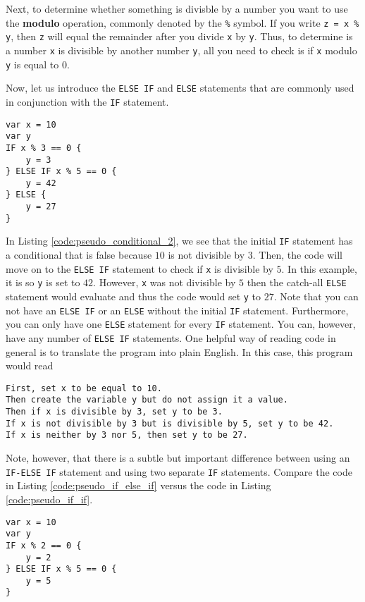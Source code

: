 \documentclass{article}
\begin{document}
Next, to determine whether something is divisble by a number you want to use the \textbf{modulo} operation, commonly denoted by the \lstinline{%} symbol.
If you write \lstinline{z = x % y}, then \lstinline{z} will equal the remainder after you divide \lstinline{x} by \lstinline{y}.
Thus, to determine is a number \lstinline{x} is divisible by another number \lstinline{y}, all you need to check is if \lstinline{x} modulo \lstinline{y} is equal to $0$.

Now, let us introduce the \lstinline{ELSE IF} and \lstinline{ELSE} statements that are commonly used in conjunction with the \lstinline{IF} statement.
\begin{lstlisting}[caption={A stereotypical IF-ELSE IF-ELSE statement.}, label={code:pseudo_conditional_2}]
var x = 10
var y
IF x % 3 == 0 {
    y = 3
} ELSE IF x % 5 == 0 {
    y = 42
} ELSE {
    y = 27
}
\end{lstlisting}
In Listing \ref{code:pseudo_conditional_2}, we see that the initial \lstinline{IF} statement has a conditional that is false because $10$ is not divisible by $3$.
Then, the code will move on to the \lstinline{ELSE IF} statement to check if \lstinline{x} is divisible by $5$.
In this example, it is so \lstinline{y} is set to $42$.
However, \lstinline{x} was not divisible by $5$ then the catch-all \lstinline{ELSE} statement would evaluate and thus the code would set \lstinline{y} to $27$.
Note that you can not have an \lstinline{ELSE IF} or an \lstinline{ELSE} without the initial \lstinline{IF} statement.
Furthermore, you can only have one \lstinline{ELSE} statement for every \lstinline{IF} statement.
You can, however, have any number of \lstinline{ELSE IF} statements.
One helpful way of reading code in general is to translate the program into plain English.
In this case, this program would read
\begin{lstlisting}
First, set x to be equal to 10.
Then create the variable y but do not assign it a value.
Then if x is divisible by 3, set y to be 3.
If x is not divisible by 3 but is divisible by 5, set y to be 42.
If x is neither by 3 nor 5, then set y to be 27.
\end{lstlisting}

Note, however, that there is a subtle but important difference between using an \lstinline{IF-ELSE IF} statement and using two separate \lstinline{IF} statements.
Compare the code in Listing \ref{code:pseudo_if_else_if} versus the code in Listing \ref{code:pseudo_if_if}.

\begin{lstlisting}[caption={IF ELSE-IF.}, label={code:pseudo_if_else_if}]
var x = 10
var y
IF x % 2 == 0 {
    y = 2
} ELSE IF x % 5 == 0 {
    y = 5
}
\end{lstlisting}
\end{document}
